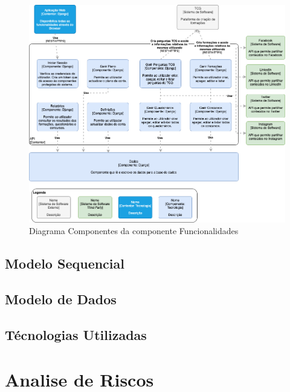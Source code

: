 \begin{figure}[ht!]
	\begin{center}
		\includegraphics[width=1\textwidth]{img/arq/diagrama-componentes1}
		\caption{Diagrama Componentes da componente Funcionalidades}
		\label{fig:arq-componentes1}
	\end{center}
\end{figure}

\subsection{Modelo Sequencial}

\subsection{Modelo de Dados}

\subsection{Técnologias Utilizadas}

\section{Analise de Riscos}
\label{analiseriscos}
\blankpage

\glsresetall
